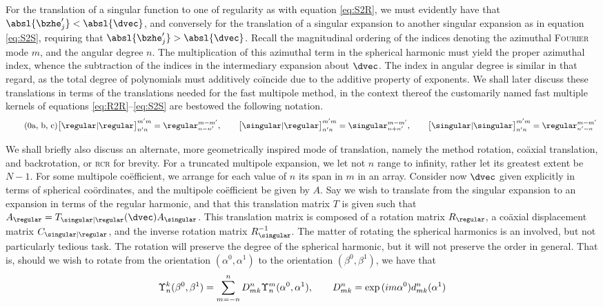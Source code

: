 \noindent
For the translation of a singular function to one of regularity as with equation \eqref{eq:S2R}, we must evidently have that $\absl{\bzhe_j^{\prime}} < \absl{\dvec}$, and conversely for the translation of a singular expansion to another singular expansion as in equation \eqref{eq:S2S}, requiring that $\absl{\bzhe_j^{\prime}} > \absl{\dvec}$.
Recall the magnitudinal ordering of the indices denoting the azimuthal \textsc{Fourier} mode $m$, and the angular degree $n$.
The multiplication of this azimuthal term in the spherical harmonic must yield the proper azimuthal index, whence the subtraction of the indices in the intermediary expansion about $\dvec$.
The index in angular degree is similar in that regard, as the total degree of polynomials must additively coïncide due to the additive property of exponents.
We shall later discuss these translations in terms of the translations needed for the fast multipole method, in the context thereof the customarily named fast multiple kernels of equations \eqref{eq:R2R}--\eqref{eq:S2S} are bestowed the following notation.
%
\begin{subequations}\label{eq:translation_notation}
  \begin{equation}\tag{\theequation{a, b, c}}
    {\big[ \regular\vert\regular \big]}_{n^{\prime}n}^{m^{\prime}m} = \regular_{n - n^{\prime}}^{m - m^{\prime}}, \qquad
    {\big[ \singular\vert\regular \big]}_{n^{\prime}n}^{m^{\prime}m} = \singular_{n + n^{\prime}}^{m - m^{\prime}}, \qquad
    {\big[ \singular\vert\singular \big]}_{n^{\prime}n}^{m^{\prime}m} = \regular_{n^{\prime} - n}^{m - m^{\prime}}
  \end{equation}
\end{subequations}

\noindent
We shall briefly also discuss an alternate, more geometrically inspired mode of translation, namely the method rotation, coäxial translation, and backrotation, or \textsc{rcr} for brevity.
For a truncated multipole expansion, we let not $n$ range to infinity, rather let its greatest extent be $N - 1$.
For some multipole coëfficient, we arrange for each value of $n$ its span in $m$ in an array.
Consider now $\dvec$ given explicitly in terms of spherical coördinates, and the multipole coëfficient be given by $A$.
Say we wish to translate from the singular expansion to an expansion in terms of the regular harmonic, and that this translation matrix $T$ is given such that $A_{\regular} = T_{\singular\vert\regular}(\dvec) A_{\singular}$.
This translation matrix is composed of a rotation matrix $R_{\regular}$, a coäxial displacement matrix $C_{\singular\vert\regular}$, and the inverse rotation matrix $R_{\singular}^{-1}$.
The matter of rotating the spherical harmonics is an involved, but not particularly tedious task.
The rotation will preserve the degree of the spherical harmonic, but it will not preserve the order in general.
That is, should we wish to rotate from the orientation $(\alpha^0, \alpha^1)$ to the orientation $(\beta^0, \beta^1)$, we have that
%
\begin{equation}
  \Upsilon_n^k(\beta^0, \beta^1) = \sum_{m = -n}^{n} D^n_{mk} \Upsilon_n^m(\alpha^0, \alpha^1), \qquad
  D^n_{mk} = \exp{(im\alpha^0)} d^n_{mk}(\alpha^1)
\end{equation}

